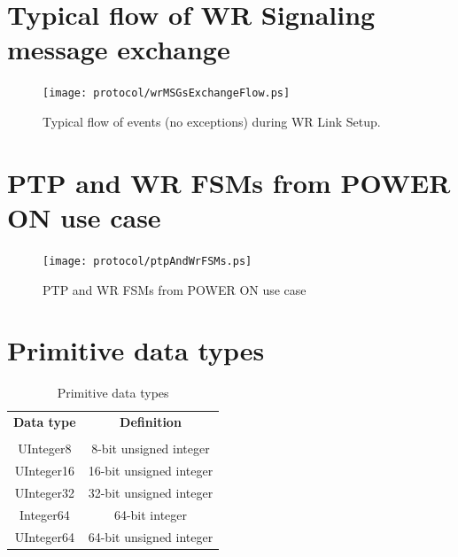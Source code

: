 \documentclass[a4paper, 12pt]{article}
\begin{document}
\newpage

\section{Typical flow of WR Signaling message exchange}
\label{ap:wr_lsu_flow}
\begin{figure}[ht!]
  \centering
  \texttt{[image: protocol/wrMSGsExchangeFlow.ps]}
  \caption{Typical flow of events (no exceptions) during WR Link Setup.}
  \label{fig:wrFSMcommun}
\end{figure}

\newpage


\section{PTP and WR FSMs from POWER ON use case}
\label{ap:ptpAndWrFSMS}
\begin{figure}[ht!]
  \centering
  \texttt{[image: protocol/ptpAndWrFSMs.ps]}
  \caption{PTP and WR FSMs from POWER ON use case}
  \label{fig:wrFSMcommun}
\end{figure}

\newpage


\section{Primitive data types}
\label{ap:wrDataTypes}

\begin{table}[ht!]
\caption{Primitive data types}
\centering
\begin{tabular}{| c | c |}          					\hline
\textbf{Data type  } &  \textbf{Definition}				  \\ 
		     &  	               				  \\ \hline
UInteger8	     &   8-bit unsigned integer				  \\ \hline
UInteger16	     &  16-bit unsigned integer				  \\ \hline
UInteger32	     &  32-bit unsigned integer				  \\ \hline
 Integer64	     &  64-bit integer					  \\ \hline
UInteger64	     &  64-bit unsigned integer				  \\ \hline
\end{tabular}
\label{tab:wrPtpProfile}
\end{table}
\end{document}
